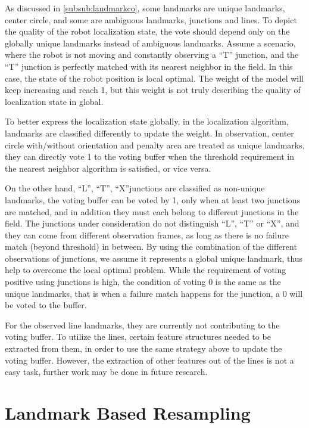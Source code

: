 As discussed in \autoref{subsub:landmarkco}, some landmarks are unique landmarks, \ie center circle, and some are ambiguous landmarks, \ie junctions and lines. To depict the quality of the robot localization state, the vote should depend only on the globally unique landmarks instead of ambiguous landmarks. Assume a scenario, where the robot is not moving and constantly observing a ``T'' junction, and the ``T'' junction is perfectly matched with its nearest neighbor in the field. In this case, the state of the robot position is local optimal. The weight of the model will keep increasing and reach 1, but this weight is not truly describing the quality of localization state in global. 

To better express the localization state globally, in the localization algorithm, landmarks are classified differently to update the weight. In observation, center circle with/without orientation and penalty area are treated as unique landmarks, they can directly vote 1 to the voting buffer when the threshold requirement in the nearest neighbor algorithm is satisfied, or vice versa. 

On the other hand, ``L'', ``T'', ``X''junctions are classified as non-unique landmarks, the voting buffer can be voted by 1, only when at least two junctions are matched, and in addition they must each belong to different junctions in the field. The junctions under consideration do not distinguish ``L'', ``T'' or ``X'', and they can come from different observation frames, as long as there is no failure match (beyond threshold) in between. By using the combination of the different observations of junctions, we assume it represents a global unique landmark, thus help to overcome the local optimal problem. While the requirement of voting positive using junctions is high, the condition of voting 0 is the same as the unique landmarks, that is when a failure match happens for the junction, a 0 will be voted to the buffer.  

For the observed line landmarks, they are currently not contributing to the voting buffer. To utilize the lines, certain feature structures needed to be extracted from them, in order to use the same strategy above to update the voting buffer. However, the extraction of other features out of the lines is not a easy task, further work may be done in future research. 


\section{Landmark Based Resampling}\label{sec:resample}

